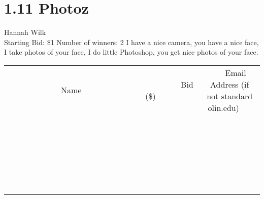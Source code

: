 \documentclass[11pt]{article}
\begin{document}
\section*{1.11 Photoz }
Hannah Wilk
\\
Starting Bid: \$1
\newline
Number of winners: 2
\newline
I have a nice camera, you have a nice face, I take photos of your face, I do little Photoshop, you get nice photos of your face.
\\[6ex]
\begin{tabular}{c c c}
~~~~~~~~~~~~~Name~~~~~~~~~~~~~ & ~~~~~~~~~Bid (\$)~~~~~~~~~  & ~~~Email Address (if not standard olin.edu)~~~\\
 & & \\
\hline
 & & \\
\hline
 & & \\
\hline
 & & \\
\hline
 & & \\
\hline
 & & \\
\hline
 & & \\
\hline
 & & \\
\hline
 & & \\
\hline
 & & \\
\hline
 & & \\
\hline
 & & \\
\hline
 & & \\
\hline
 & & \\
\hline
 & & \\
\hline
 & & \\
\hline
 & & \\
\hline
 & & \\
\hline
 & & \\
\hline
 & & \\
\hline
 & & \\
\hline
 & & \\
\hline
 & & \\
\hline
 & & \\
\hline
 & & \\
\hline
 & & \\
\hline
\end{tabular}
\newpage
\end{document}
